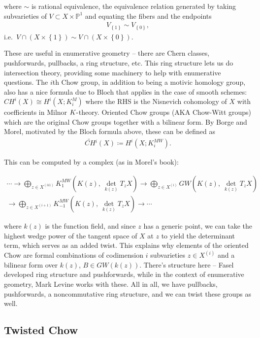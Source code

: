 where \(\sim\) is rational equivalence, the equivalence relation
generated by taking subvarieties of \(V\subset X\times{\mathbb{P}}^1\)
and equating the fibers and the endpoints
\begin{align*}
V_{\left\{{1}\right\}} \sim V_{\left\{{0}\right\}}
,\end{align*}
i.e.~\(V\cap(X\times\left\{{1}\right\}) \sim V\cap(X\times\left\{{0}\right\})\).

These are useful in enumerative geometry -- there are Chern classes,
pushforwards, pullbacks, a ring structure, etc. This ring structure lets
us do intersection theory, providing some machinery to help with
enumerative questions. The \(i\)th Chow group, in addition to being a
motivic homology group, also has a nice formula due to Bloch that
applies in the case of smooth schemes: \(CH^i(X) \cong H^i(X; K^{M}_i)\)
where the RHS is the Nisnevich cohomology of \(X\) with coefficients in
Milnor \(K{\hbox{-}}\)theory. Oriented Chow groups (AKA Chow-Witt
groups) which are the original Chow groups together with a bilinear
form. By Borge and Morel, motivated by the Bloch formula above, these
can be defined as
\begin{align*}
\widetilde{CH}{}^i(X) \coloneqq H^i(X; K_i^{MW}).
\end{align*}

This can be computed by a complex (as in Morel's book):

\begin{align*} \cdots \to \bigoplus_{z\in X^{(ii1)}} K^{MW}_{1}(K(z), ~\det_{k(z)} T_z X) \to \bigoplus_{z\in X^{(i)}} GW(K(z), ~\det_{k(z)} T_z X)  \\ \to \bigoplus_{z\in X^{(i+1)}} K^{MW}_{-1}(K(z), ~\det_{k(z)} T_z X)  \to \cdots \end{align*}

where \(k(z)\) is the function field, and since \(z\) has a generic
point, we can take the highest wedge power of the tangent space of \(X\)
at \(z\) to yield the determinant term, which serves as an added twist.
This explains why elements of the oriented Chow are formal combinations
of codimension \(i\) subvarieties \(z\in X^{(i)}\) and a bilinear form
over \(k(z)\), \(B\in GW(k(z))\). There's structure here -- Fasel
developed ring structure and pushforwards, while in the context of
enumerative geometry, Mark Levine works with these. All in all, we have
pullbacks, pushforwards, a noncommutative ring structure, and we can
twist these groups as well.

\hypertarget{twisted-chow}{%
\subsection{Twisted Chow}\label{twisted-chow}}

